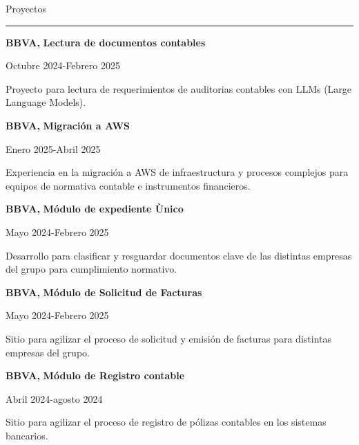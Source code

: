 \documentclass{article}
\begin{document}
\begin{minipage}[t]{0.60\textwidth}  %
\setlength{\baselineskip}{0.1\baselineskip}
\vspace{0.5cm}  %

{\large Proyectos}
\rule{\linewidth}{0.4pt}

\vspace{0.2cm}

\large \textbf{BBVA, }
\large \textbf{Lectura de documentos contables}

{\small Octubre 2024-Febrero 2025}

{\small Proyecto para lectura de requerimientos de auditorias contables con LLMs (Large Language Models).}

\vspace{0.5cm}

\large \textbf{BBVA, }
\large \textbf{Migración a AWS}

{\small Enero 2025-Abril 2025}

{\small Experiencia en la migración a AWS de infraestructura y procesos complejos para equipos de normativa contable e instrumentos financieros.}

\vspace{0.5cm}

\large \textbf{BBVA, }
\large \textbf{Módulo de expediente Ùnico}

{\small Mayo 2024-Febrero 2025}

{\small Desarrollo para clasificar y resguardar documentos clave de las distintas empresas del grupo para cumplimiento normativo.}

\vspace{0.5cm}

\large \textbf{BBVA, }
\large \textbf{Módulo de Solicitud de Facturas}

{\small Mayo 2024-Febrero 2025}

{\small Sitio para agilizar el proceso de solicitud y emisión de facturas para distintas empresas del grupo.}

\vspace{0.5cm}

\large \textbf{BBVA, }
\large \textbf{Módulo de Registro contable}

{\small Abril 2024-agosto 2024}

{\small Sitio para agilizar el proceso de registro de pólizas contables en los sistemas bancarios.}

\vspace{0.5cm}

\end{minipage}
\end{document}
